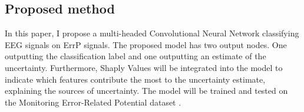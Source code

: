 \subsection{Proposed method}

In this paper, I propose a multi-headed Convolutional Neural Network classifying EEG signals on ErrP signals. The proposed model has two output nodes. One outputting the classification label and one outputting an estimate of the uncertainty. Furthermore, Shaply Values will be integrated into the model to indicate which features contribute the most to the uncertainty estimate, explaining the sources of uncertainty. The model will be trained and tested on the Monitoring Error-Related Potential dataset \citep{chavarriaga2010learning}.